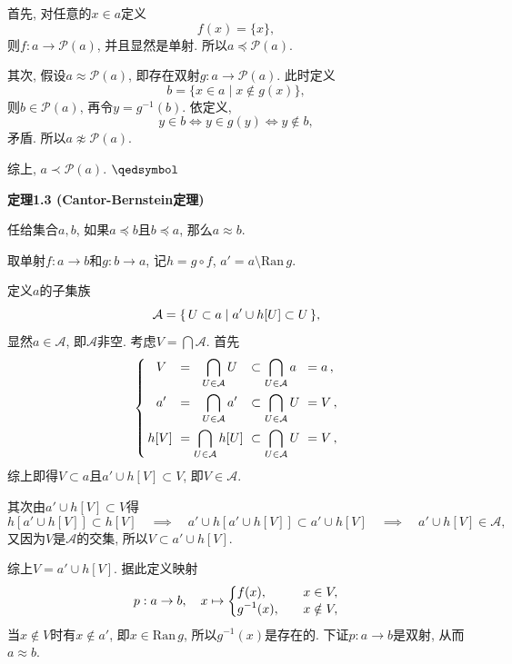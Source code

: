 \documentclass[UTF8]{ctexart}
\begin{document}
首先, 对任意的$x\in a$定义
\[
    f(x)=\{x\},
\]
则$f:a\to\mathcal{P}(a)$, 并且显然是单射. 所以$a\preccurlyeq\mathcal{P}(a)$.

其次, 假设$a\approx\mathcal{P}(a)$, 即存在双射$g:a\to\mathcal{P}(a)$. 此时定义
\[
    b=\{x\in a\mid x\notin g(x)\},
\]
则$b\in\mathcal{P}(a)$, 再令$y=g^{-1}(b)$. 依定义,
\[
    y\in b\iff y\in g(y)\iff y\notin b,
\]
矛盾. 所以$a\not\approx\mathcal{P}(a)$.

综上, $a\prec\mathcal{P}(a)$. \hfill $\qedsymbol$





\newpage

\hypertarget{sec:定理1.3}{}
\noindent\textbf{定理1.3 (Cantor-Bernstein定理)}

任给集合$a,b$, 如果$a\preccurlyeq b$且$b\preccurlyeq a$, 那么$a\approx b$.


取单射$f:a\to b$和$g:b\to a$, 记$h=g\circ f$, $a'=a\setminus\mathrm{Ran}\,g$.

定义$a$的子集族
\vspace{-3pt}
\[
    \mathcal{A}=\{\,U\subset a\mid a'\cup h[U]\subset U\,\},\\[-3pt]
\]
显然$a\in\mathcal{A}$, 即$\mathcal{A}$非空.
考虑$\displaystyle V=\bigcap\mathcal{A}$. 首先
\vspace{3pt}
\[\left\{\begin{aligned}
    \,&\,\,\,\,V\!\!\!\!&&=\,\,\,\,\bigcap_{U\in\mathcal{A}}U\!\!\!\!&&
    \subset\bigcap_{U\in\mathcal{A}}a\!\!\!\!&&=a\,,\\
    \,&\,\,\,\,a'\!\!\!\!&&=\,\,\,\,\bigcap_{U\in\mathcal{A}}a'\!\!\!\!&&
    \subset\bigcap_{U\in\mathcal{A}}U\!\!\!\!&&=V\,,\\
    \,&h[V]\!\!\!\!&&=\bigcap_{U\in\mathcal{A}}h[U]\!\!\!\!&&
    \subset\bigcap_{U\in\mathcal{A}}U\!\!\!\!&&=V\,,
\end{aligned}\right.\\[3pt]\]
综上即得$V\subset a$且$a'\cup h[V]\subset V$, 即$V\in\mathcal{A}$.

\vspace{3pt}
其次由$a'\cup h[V]\subset V$得
\[
    h[a'\cup h[V]]\subset h[V]\quad\implies\quad
    a'\cup h[a'\cup h[V]]\subset a'\cup h[V]\quad\implies\quad
    a'\cup h[V]\in\mathcal{A},
\]
又因为$V$是$\mathcal{A}$的交集, 所以$V\subset a'\cup h[V]$.

\vspace{3pt}
综上$V=a'\cup h[V]$. 据此定义映射
\vspace{-3pt}
\[p:a\to b,\quad x\mapsto\left\{\begin{aligned}
    &f(x),\quad&&x\in V,\\[-3pt]
    &g^{-1}(x),\quad&&x\notin V,
\end{aligned}\right.\\[3pt]\]
当$x\notin V$时有$x\notin a'$, 即$x\in\mathrm{Ran}\,g$, 所以$g^{-1}(x)$是存在的.
下证$p:a\to b$是双射, 从而$a\approx b$.
\end{document}
